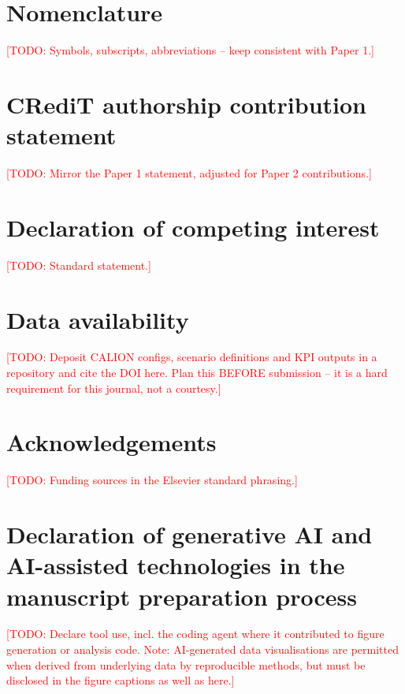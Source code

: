 \documentclass[review,3p]{elsarticle}
\newcommand{\todo}[1]{\textcolor{red}{[TODO: #1]}}
\begin{document}
\section*{Nomenclature}
\todo{Symbols, subscripts, abbreviations -- keep consistent with Paper 1.}

\section*{CRediT authorship contribution statement}
\todo{Mirror the Paper 1 statement, adjusted for Paper 2 contributions.}

\section*{Declaration of competing interest}
\todo{Standard statement.}

\section*{Data availability}
\todo{Deposit CALION configs, scenario definitions and KPI outputs in a
repository and cite the DOI here. Plan this BEFORE submission -- it is
a hard requirement for this journal, not a courtesy.}

\section*{Acknowledgements}
\todo{Funding sources in the Elsevier standard phrasing.}

\section*{Declaration of generative AI and AI-assisted technologies in
the manuscript preparation process}
\todo{Declare tool use, incl. the coding agent where it contributed to
figure generation or analysis code. Note: AI-generated data
visualisations are permitted when derived from underlying data by
reproducible methods, but must be disclosed in the figure captions as
well as here.}
\end{document}
